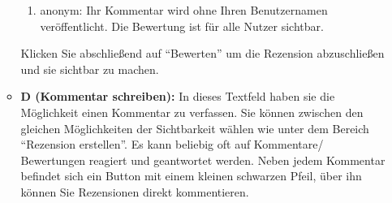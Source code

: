 \begin{enumerate}
\begin{itemize}
\begin{enumerate}
            \item anonym: Ihr Kommentar wird ohne Ihren Benutzernamen veröffentlicht. Die Bewertung ist für alle Nutzer sichtbar.
        \end{enumerate}
       	Klicken Sie abschließend auf \enquote{Bewerten} um die Rezension abzuschließen und sie sichtbar zu machen.
        \item \textbf{D (Kommentar schreiben):} In dieses Textfeld haben sie die Möglichkeit einen Kommentar zu verfassen. Sie können zwischen den gleichen Möglichkeiten der Sichtbarkeit wählen wie unter dem Bereich \enquote{Rezension erstellen}.
\newline Es kann beliebig oft auf Kommentare/ Bewertungen  reagiert und geantwortet werden. Neben jedem Kommentar befindet sich ein Button mit einem kleinen schwarzen Pfeil, über ihn können Sie Rezensionen direkt kommentieren. 
    \end{itemize}
\end{enumerate}